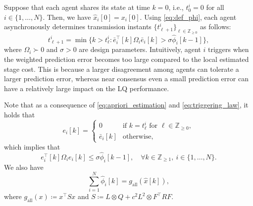 \documentclass[letterpaper,10pt,conference]{ieeeconf}
\newcommand{\Z}{\mathbb{Z}}
\begin{document}
Suppose that each agent shares its state at time $k=0$, i.e., $t^i_0 = 0$ for all $i \in \{1,\dots,N\}$.
Then, we have $\hat{x}_i[0] = x_i[0]$.
Using \eqref{eq:def_phi}, each agent asynchronously determines transmission instants $\{t^i_{\ell+1}\}_{\ell \in \Z_{\geq 0}}$ as follows:
\begin{equation} \label{eq:triggering_law}
  t^i_{\ell + 1} = \min\{k > t^i_\ell \colon \bar{e}_i^\top[k] \Omega_i \bar{e}_i[k] > \sigma \hat\phi_i[k-1]\},
\end{equation}
where $\Omega_i \succ 0$ and $\sigma > 0$ are design parameters.
Intuitively, agent $i$ triggers when the weighted prediction error becomes too large compared to the local estimated stage cost.
This is because a larger disagreement among agents can tolerate a larger prediction error, whereas near consensus even a small prediction error can have a relatively large impact on the LQ performance.

Note that as a consequence of \eqref{eq:apriori_estimation} and \eqref{eq:triggering_law}, it holds that
\begin{equation}
  e_i[k] = \begin{cases}
    0 & \text{if $k = t^i_\ell$ for $\ell \in \Z_{\geq 0}$}, \\
    \bar{e}_i[k] & \text{otherwise},
  \end{cases}
\end{equation}
which implies that
\begin{equation} \label{eq:inequality_ek_phi}
  e_i^\top[k] \Omega_i e_i[k] \leq \sigma \hat\phi_i[k-1],\quad \forall k\in\Z_{\geq 1},\ i\in\{1,\dots,N\}.
\end{equation}
We also have
\begin{equation} \label{eq:inequality_phi_sum}
  \sum_{i=1} ^N \hat\phi_i[k] = g_{\mathrm{all}}(\hat{x}[k]),
\end{equation}
where $g_{\mathrm{all}}(x) \coloneqq x^\top S x$ and $S \coloneqq L \otimes Q + c^2L^2\otimes F^\top RF$.
\end{document}
